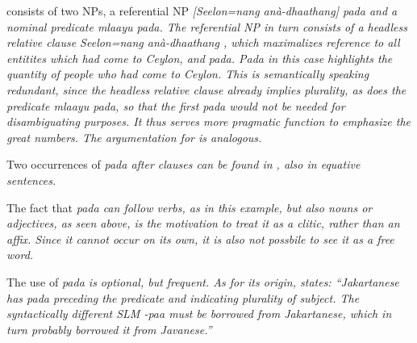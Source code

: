 

 consists of two NPs, a referential NP \em [Seelon=nang anà-dhaathang] pada \em and a nominal predicate \em mlaayu pada\em. The referential NP in turn consists of a headless relative clause \em Seelon=nang anà-dhaathang \zero{}\em, which maximalizes reference to all entitites which had come to Ceylon, and \em pada\em. \em Pada \em in this case highlights the quantity of people who had come to Ceylon. This is semantically speaking redundant, since the headless relative clause already implies plurality, as does the predicate \em mlaayu pada\em, so that the first \em pada \em would not be needed for disambiguating purposes. It thus serves more pragmatic function to emphasize the great numbers. The argumentation for  is analogous.

Two occurrences of \em pada \em after clauses can be found in , also in equative sentences.


The fact that \em pada \em can follow verbs, as in this example, but also nouns or adjectives, as seen above, is the motivation to treat it as a clitic, rather than an affix. Since it cannot occur on its own, it is also not possbile to see it as a free word.


The use of \em pada \em is optional, but frequent. As for its origin,  \citet[26]{Adelaar1991} states: ``Jakartanese has \em pada \em preceding the predicate and indicating plurality of subject. The syntactically different SLM \em -pa\dotd a \em must be borrowed from Jakartanese, which in turn probably borrowed it from Javanese.''  

